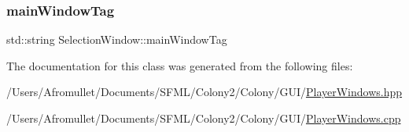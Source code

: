 \mbox{\label{class_selection_window_a555e8cf723b237c5a2bef0f190e03c76}} 
\subsubsection{\texorpdfstring{main\+Window\+Tag}{mainWindowTag}}
{\footnotesize\ttfamily std\+::string Selection\+Window\+::main\+Window\+Tag\hspace{0.3cm}{\ttfamily [protected]}}



The documentation for this class was generated from the following files\+:\begin{DoxyCompactItemize}
\item 
/\+Users/\+Afromullet/\+Documents/\+S\+F\+M\+L/\+Colony2/\+Colony/\+G\+U\+I/\mbox{\hyperlink{_player_windows_8hpp}{Player\+Windows.\+hpp}}\item 
/\+Users/\+Afromullet/\+Documents/\+S\+F\+M\+L/\+Colony2/\+Colony/\+G\+U\+I/\mbox{\hyperlink{_player_windows_8cpp}{Player\+Windows.\+cpp}}\end{DoxyCompactItemize}
